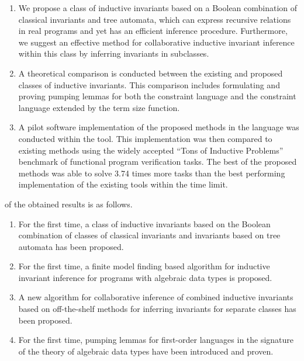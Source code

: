\begin{enumerate}[beginpenalty=10000]
  \item We propose a class of inductive invariants based on a Boolean combination of classical invariants and tree automata, which can express recursive relations in real programs and yet has an efficient inference procedure. Furthermore, we suggest an effective method for collaborative inductive invariant inference within this class by inferring invariants in subclasses.
  \item A theoretical comparison is conducted between the existing and proposed classes of inductive invariants. This comparison includes formulating and proving pumping lemmas for both the constraint language and the constraint language extended by the term size function.
  \item A pilot software implementation of the proposed methods in the \fsharp{} language was conducted within the \theringen{} tool. This implementation was then compared to existing methods using the widely accepted ``Tons of Inductive Problems'' benchmark of functional program verification tasks. The best of the proposed methods was able to solve 3.74 times more tasks than the best performing implementation of the existing tools within the time limit.
\end{enumerate}

{\novelty{} of the obtained results is as follows.}
\begin{enumerate}[beginpenalty=10000] %
  \item For the first time, a class of inductive invariants based on the Boolean combination of classes of classical invariants and invariants based on tree automata has been proposed.
  \item For the first time, a finite model finding based algorithm for inductive invariant inference for programs with algebraic data types is proposed.
  \item A new algorithm for collaborative inference of combined inductive invariants based on off-the-shelf methods for inferring invariants for separate classes has been proposed.
   \item For the first time, pumping lemmas for first-order languages in the signature of the theory of algebraic data types have been introduced and proven.
\end{enumerate}

